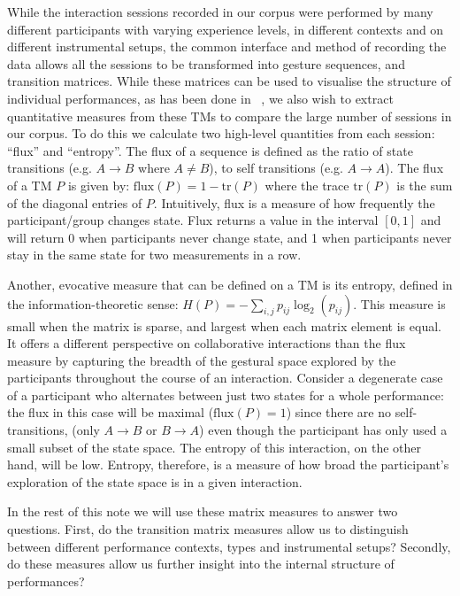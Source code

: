 \documentclass{sigchi}
\begin{document}
While the interaction sessions recorded in our corpus were performed
by many different participants with varying experience levels, in
different contexts and on different instrumental setups, the common
interface and method of recording the data allows all the sessions to
be transformed into gesture sequences, and transition matrices. While
these matrices can be used to visualise the structure of individual
performances, as has been done in ~\cite{Swift:2014tya}, we also wish to extract quantitative
measures from these TMs to compare the large number of sessions in our
corpus.
To do this we calculate two high-level quantities from each session:
``flux'' and ``entropy''. The flux of a sequence is defined as the
ratio of state transitions (e.g. $A \rightarrow B$ where $A \neq B$),
to self transitions (e.g. $A \rightarrow A $). The flux of a TM $P$ is
given by: $\mathrm{flux}(P) = 1 - \mathrm{tr}(P)$ where the trace
$\mathrm{tr}(P)$ is the sum of the diagonal entries of $P$.
Intuitively, flux is a measure of how frequently the participant/group
changes state. Flux returns a value in the interval $[0,1]$ and will
return 0 when participants never change state, and 1 when participants
never stay in the same state for two measurements in a row.

Another, evocative measure that can be defined on a TM is its
entropy, defined in the information-theoretic\cite{Shannon:1948rt}
sense: $H(P) = -\sum_{i,j}p_{ij}\log_2(p_{ij})$. This measure
is small when the matrix is sparse, and largest when each matrix
element is equal. It offers a different perspective on collaborative
interactions than the flux measure by capturing the breadth of the
gestural space explored by the participants throughout the course of
an interaction. Consider a degenerate case of a participant who
alternates between just two states for a whole performance: the flux in
this case will be maximal ($\mathrm{flux}(P) = 1$) since there are no
self-transitions, (only $A \rightarrow B$ or $ B \rightarrow A$) even
though the participant has only used a small subset of the state
space. The entropy of this interaction, on the other hand, will be
low. Entropy, therefore, is a measure of how broad the participant's
exploration of the state space is in a given interaction.

In the rest of this note we will use these matrix measures to answer
two questions. First, do the transition matrix measures allow us to
distinguish between different performance contexts, types and
instrumental setups? Secondly, do these measures allow us further
insight into the internal structure of performances?
\end{document}
